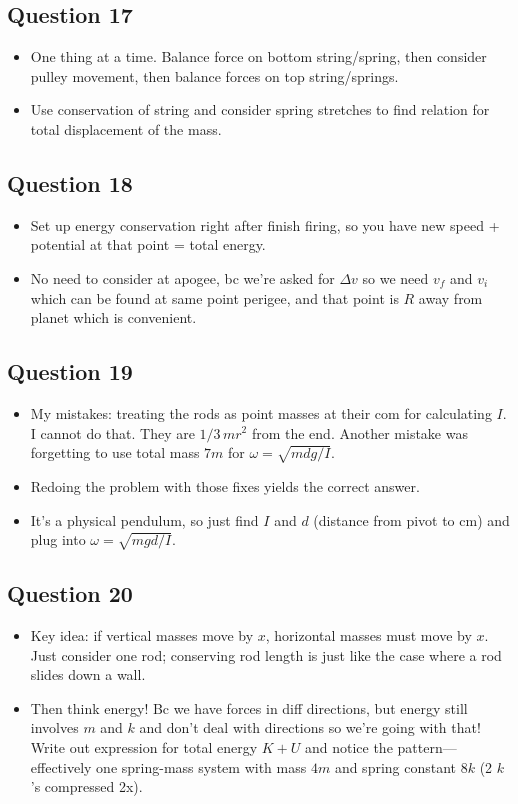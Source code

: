 \documentclass[11pt]{article}
\begin{document}
\subsection*{Question 17}
\begin{itemize}[leftmargin=*]
\item One thing at a time. Balance force on bottom string/spring, then consider pulley movement, then balance forces on top string/springs.
\item Use conservation of string and consider spring stretches to find relation for total displacement of the mass.
\end{itemize}

\subsection*{Question 18}
\begin{itemize}[leftmargin=*]
\item Set up energy conservation right after finish firing, so you have new speed + potential at that point = total energy.
\item No need to consider at apogee, bc we're asked for $\Delta v$ so we need $v_f$ and $v_i$ which can be found at same point perigee, and that point is $R$ away from planet which is convenient.
\end{itemize}

\subsection*{Question 19}
\begin{itemize}[leftmargin=*]
\item My mistakes: treating the rods as point masses at their com for calculating $I$. I cannot do that. They are $1/3\,mr^2$ from the end. Another mistake was forgetting to use total mass $7m$ for $\omega=\sqrt{mdg/I}$.
\item Redoing the problem with those fixes yields the correct answer.
\item It's a physical pendulum, so just find $I$ and $d$ (distance from pivot to cm) and plug into $\omega=\sqrt{mgd/I}$.
\end{itemize}

\subsection*{Question 20}
\begin{itemize}[leftmargin=*]
\item Key idea: if vertical masses move by $x$, horizontal masses must move by $x$. Just consider one rod; conserving rod length is just like the case where a rod slides down a wall.
\item Then think energy! Bc we have forces in diff directions, but energy still involves $m$ and $k$ and don't deal with directions so we're going with that! Write out expression for total energy $K+U$ and notice the pattern—effectively one spring-mass system with mass $4m$ and spring constant $8k$ (2 $k$'s compressed 2x).
\end{itemize}
\end{document}
